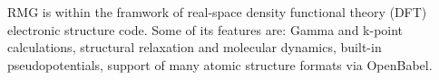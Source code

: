 RMG is within the framwork of real-space density functional theory (DFT) electronic structure code. Some of its features are: Gamma and k-point calculations, structural relaxation and molecular dynamics, built-in pseudopotentials, support of many atomic structure formats via OpenBabel.